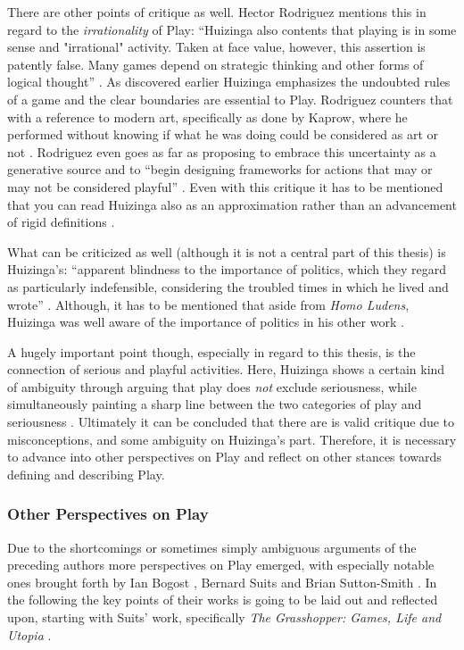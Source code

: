 There are other points of critique as well. Hector Rodriguez mentions this in regard to the \textit{irrationality} of Play: \enquote{Huizinga also contents that playing is in some sense and "irrational" activity. Taken at face value, however, this assertion is patently false. Many games depend on strategic thinking and other forms of logical thought} \cite{rodriguez2006playful}. As discovered earlier Huizinga emphasizes the undoubted rules of a game and the clear boundaries are essential to Play. Rodriguez counters that with a reference to modern art, specifically as done by Kaprow, where he performed without knowing if what he was doing could be considered as art or not \cite{kaprow1993essays}. Rodriguez even goes as far as proposing to embrace this uncertainty as a generative source and to \enquote{begin designing frameworks for actions that may or may not be considered playful} \cite{rodriguez2006playful}. Even with this critique it has to be mentioned that you can read Huizinga also as an approximation rather than an advancement of rigid definitions \cite{rodriguez2006playful}.

What can be criticized as well (although it is not a central part of this thesis) is Huizinga's: \enquote{apparent blindness to the importance of politics, which they regard as particularly indefensible, considering the troubled times in which he lived and wrote} \cite[p. 84]{anchor1978history}. Although, it has to be mentioned that aside from \textit{Homo Ludens}, Huizinga was well aware of the importance of politics in his other work \cite[p. 85]{anchor1978history}.

A hugely important point though, especially in regard to this thesis, is the connection of serious and playful activities. Here, Huizinga shows a certain kind of ambiguity through arguing that play does \textit{not} exclude seriousness, while simultaneously painting a sharp line between the two categories of play and seriousness \cite[p. 87]{anchor1978history}. Ultimately it can be concluded that there are is valid critique due to misconceptions, and some ambiguity on Huizinga's part. Therefore, it is necessary to advance into other perspectives on Play and reflect on other stances towards defining and describing Play.

\subsubsection{Other Perspectives on Play}

Due to the shortcomings or sometimes simply ambiguous arguments of the preceding authors more perspectives on Play emerged, with especially notable ones brought forth by Ian Bogost \cite{bogost2007persuasive}, Bernard Suits \cite{suits2020grasshopper} and Brian Sutton-Smith \cite{sutton2009ambiguity}. In the following the key points of their works is going to be laid out and reflected upon, starting with Suits' work, specifically \textit{The Grasshopper: Games, Life and Utopia} \cite{suits2020grasshopper}.

